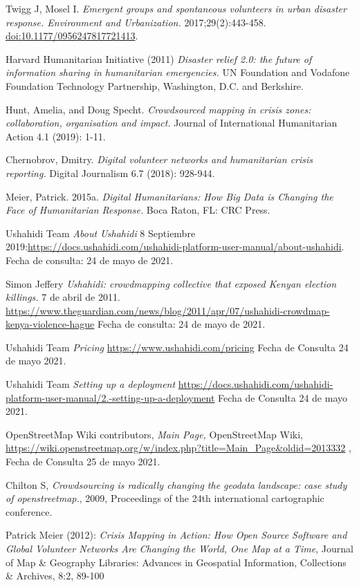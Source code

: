 \begin{thebibliography}{1}
 Twigg J, Mosel I. {\em Emergent groups and spontaneous volunteers in urban disaster response. Environment and Urbanization.}  2017;29(2):443-458. \url{doi:10.1177/0956247817721413}.

 Harvard Humanitarian Initiative (2011) {\em Disaster relief 2.0: the future of information sharing in humanitarian emergencies.} UN Foundation and Vodafone Foundation Technology Partnership, Washington, D.C. and Berkshire.

 Hunt, Amelia, and Doug Specht. {\em Crowdsourced mapping in crisis zones: collaboration, organisation and impact.} Journal of International Humanitarian Action 4.1 (2019): 1-11.

 Chernobrov, Dmitry. {\em Digital volunteer networks and humanitarian crisis reporting.} Digital Journalism 6.7 (2018): 928-944.

 Meier, Patrick. 2015a. {\em Digital Humanitarians: How Big Data is Changing the Face of Humanitarian Response.} Boca Raton, FL: CRC Press.

 Ushahidi Team {\em About Ushahidi} 8 Septiembre 2019:\url{https://docs.ushahidi.com/ushahidi-platform-user-manual/about-ushahidi}. Fecha de consulta: 24 de mayo de 2021.

 Simon Jeffery {\em Ushahidi: crowdmapping collective that exposed Kenyan election killings.} 7 de abril de 2011. \url{https://www.theguardian.com/news/blog/2011/apr/07/ushahidi-crowdmap-kenya-violence-hague} Fecha de consulta: 24 de mayo de 2021.

 Ushahidi Team {\em Pricing} \url{https://www.ushahidi.com/pricing} Fecha de Consulta 24 de mayo 2021.

 Ushahidi Team {\em Setting up a deployment} \url{https://docs.ushahidi.com/ushahidi-platform-user-manual/2.-setting-up-a-deployment} Fecha de Consulta 24 de mayo 2021.

 OpenStreetMap Wiki contributors, {\em Main Page,} OpenStreetMap Wiki, \url{https://wiki.openstreetmap.org/w/index.php?title=Main_Page&oldid=2013332} , Fecha de Consulta 25 de mayo 2021.

 Chilton S, {\em Crowdsourcing is radically changing the geodata landscape: case study of openstreetmap.}, 2009, Proceedings of the 24th international cartographic conference.

   Patrick Meier (2012): {\em Crisis Mapping in Action: How Open Source Software and Global Volunteer Networks Are Changing the World, One Map at a Time}, Journal of Map \& Geography Libraries: Advances in Geospatial Information, Collections \& Archives, 8:2, 89-100


\end{thebibliography}
